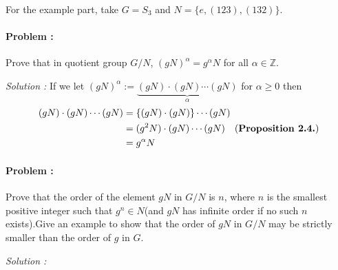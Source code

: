 For the example part, take $G= S_3$ and $N = \{e,(123),(132)\}$.

\paragraph{Problem :} Prove that in quotient group $G/N$, $(gN)^{\alpha} = g^{\alpha} N$ for all $\alpha \in \mathbb{Z}$.

\vspace{4mm}
\textit{Solution :} If we let $(gN)^{\alpha} := \underbrace{(gN) \cdot (gN) \cdots (gN)}_{\alpha}$ for $\alpha \ge 0$ then 
\begin{align*}
    (gN) \cdot (gN) \cdots (gN) &= \{(gN) \cdot (gN) \} \cdots (gN) \\
    &= (g^2N) \cdot (gN) \cdots (gN)  \quad \text{(\textbf{Proposition 2.4.})} \\
    &= g^\alpha N
\end{align*}

\paragraph{Problem :} Prove that the order of the element $gN$ in $G/N$ is $n$, where $n$ is the smallest positive integer such that 
$g^n \in N$(and $gN$ has infinite order if no such $n$ exists).Give an example to show that the order of $gN$ in $G/N$ may be strictly 
smaller than the order of $g$ in $G$.

\vspace{4mm}
\textit{Solution :} 
